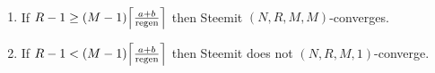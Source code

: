 \begin{theorem}
  \label{theorem:convergence:steem} \
  \begin{enumerate}
    \item \label{theorem:case:1} If $R-1 \geq (M-1)
    \ceil*{\frac{a+b}{\mathrm{regen}}}$ then Steemit $(N,R,M,M)$-converges.
    \item \label{theorem:case:2} If $R-1 < (M-1)
    \ceil*{\frac{a+b}{\mathrm{regen}}}$ then Steemit does not
    $(N,R,M,1)$-converge.
  \end{enumerate}
\end{theorem}
